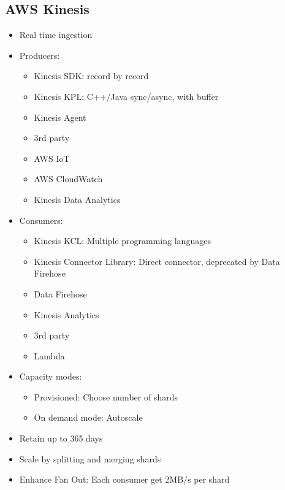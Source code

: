 \documentclass[../../main.tex]{subfiles}
\begin{document}
\subsection{AWS Kinesis}
\begin{itemize}
    \item Real time ingestion
    \item Producers:
    \begin{itemize}
        \item Kinesis SDK: record by record
        \item Kinesis KPL: C++/Java sync/async, with buffer
        \item Kinesis Agent
        \item 3rd party
        \item AWS IoT
        \item AWS CloudWatch
        \item Kinesis Data Analytics
    \end{itemize}
    \item Consumers:
    \begin{itemize}
        \item Kinesis KCL: Multiple programming languages
        \item Kinesis Connector Library: Direct connector, deprecated by Data Firehose
        \item Data Firehose
        \item Kinesis Analytics
        \item 3rd party
        \item Lambda
    \end{itemize}
    \item Capacity modes:
    \begin{itemize}
        \item Provisioned: Choose number of shards
        \item On demand mode: Autoscale
    \end{itemize}
    \item Retain up to 365 days
    \item Scale by splitting and merging shards
    \item Enhance Fan Out: Each consumer get 2MB/s per shard
\end{itemize}
\end{document}
